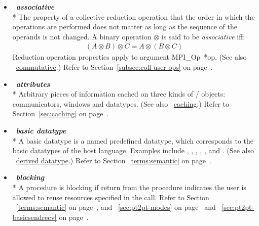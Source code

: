 \begin{itemize}
\label{glossary:associative}
\item  ~\hypertarget{glossary:associative}{\emph{\textbf{associative}}} \\*
The property of a collective reduction operation that the order in which the operations are 
performed does not matter as long as the sequence of the operands is not changed. 
A binary operation $ \otimes $ is said to be \emph{associative} iff:
\begin{eqnarray}
( A \otimes B )  \otimes C = A   \otimes ( B   \otimes C ) 
\end{eqnarray}
Reduction operation properties apply to  argument MPI\_Op~*op.
(See also ~\hyperlink{glossary:commutative}{commutative}.)
Refer to Section~\ref{subsec:coll-user-ops} on page~\pageref{subsec:coll-user-ops}.

\label{glossary:attributes}
\item  ~\hypertarget{glossary:attributes}{\emph{\textbf{attributes}}} \\*
Arbitrary pieces of information cached on three kinds of \MPI/ objects:
communicators, windows and datatypes.
(See also ~\hyperlink{glossary:caching}{caching}.)
Refer to Section~\ref{sec:caching} on page~\pageref{sec:caching}.

\label{glossary:basic_datatype}
\item  ~\hypertarget{glossary:basic_datatype}{\emph{\textbf{basic datatype}}} \\*
A basic datatype is a named predefined datatype, which corresponds to
the basic datatypes of the host language. Examples include
,
,
,
,
, and
.
(See also ~\hyperlink{glossary:derived_datatype}{derived datatype}.)
Refer to Section~\ref{terms:semantic} on page~\pageref{terms:semantic}.

\label{glossary:blocking}
\item  ~\hypertarget{glossary:blocking}{\emph{\textbf{blocking}}} \\*
A procedure is blocking if return from the procedure indicates the user
is allowed to reuse resources specified in the call.
Refer to Section ~\ref{terms:semantic} on page~\pageref{terms:semantic},
and ~\ref{sec:pt2pt-modes} on page~\pageref{sec:pt2pt-modes}
and ~\ref{sec:pt2pt-basicsendrecv} on page~\pageref{sec:pt2pt-basicsendrecv}.


\end{itemize}
